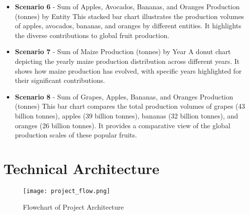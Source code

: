 \documentclass{article}
\begin{document}
\begin{itemize}
\item \textbf{Scenario 6} - Sum of Apples, Avocados, Bananas, and Oranges Production (tonnes) by Entity
This stacked bar chart illustrates the production volumes of apples, avocados, bananas, and oranges by different entities. It highlights the diverse contributions to global fruit production. \\

\item \textbf{Scenario 7} - Sum of Maize Production (tonnes) by Year
A donut chart depicting the yearly maize production distribution across different years. It shows how maize production has evolved, with specific years highlighted for their significant contributions. \\

\item \textbf{Scenario 8} - Sum of Grapes, Apples, Bananas, and Oranges Production (tonnes)
This bar chart compares the total production volumes of grapes (43 billion tonnes), apples (39 billion tonnes), bananas (32 billion tonnes), and oranges (26 billion tonnes). It provides a comparative view of the global production scales of these popular fruits.

\end{itemize}

\section{Technical Architecture}
\renewcommand{\tablename}{Figure}
\begin{figure}[H]
  \centering
  \texttt{[image: project\_flow.png]}
  \caption{Flowchart of Project Architecture}
  \label{fig:project_flow}
\end{figure}
\end{document}
